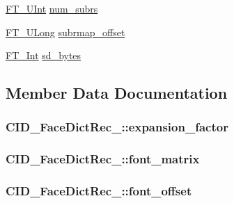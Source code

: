\begin{DoxyCompactItemize}
\item 
\hyperlink{fttypes_8h_abcb8db4dbf35d2b55a9e8c7b0926dc52}{F\-T\-\_\-\-U\-Int} \hyperlink{struct_c_i_d___face_dict_rec___a611c406c8d7cd2e37d077070f4bb3ebe}{num\-\_\-subrs}
\item 
\hyperlink{fttypes_8h_a4fac88bdba78eb76b505efa6e4fbf3f5}{F\-T\-\_\-\-U\-Long} \hyperlink{struct_c_i_d___face_dict_rec___a45d58111727af70018289e7c5b64ba8c}{subrmap\-\_\-offset}
\item 
\hyperlink{fttypes_8h_af90e5fb0d07e21be9fe6faa33f02484c}{F\-T\-\_\-\-Int} \hyperlink{struct_c_i_d___face_dict_rec___aecdf98f9671f22c1715ec929b77767ce}{sd\-\_\-bytes}
\end{DoxyCompactItemize}


\subsection{Member Data Documentation}
\hypertarget{struct_c_i_d___face_dict_rec___ae601bb5bc25e9a5f3da8e7c12fef6c92}{
\subsubsection[{expansion\-\_\-factor}]{ C\-I\-D\-\_\-\-Face\-Dict\-Rec\-\_\-\-::expansion\-\_\-factor}}\label{struct_c_i_d___face_dict_rec___ae601bb5bc25e9a5f3da8e7c12fef6c92}
\hypertarget{struct_c_i_d___face_dict_rec___aa418f6ce40b7574b6234e0ab48377e4b}{
\subsubsection[{font\-\_\-matrix}]{ C\-I\-D\-\_\-\-Face\-Dict\-Rec\-\_\-\-::font\-\_\-matrix}}\label{struct_c_i_d___face_dict_rec___aa418f6ce40b7574b6234e0ab48377e4b}
\hypertarget{struct_c_i_d___face_dict_rec___aa62daa8d45ed4a817f1207cbd452d61e}{
\subsubsection[{font\-\_\-offset}]{ C\-I\-D\-\_\-\-Face\-Dict\-Rec\-\_\-\-::font\-\_\-offset}}\label{struct_c_i_d___face_dict_rec___aa62daa8d45ed4a817f1207cbd452d61e}
